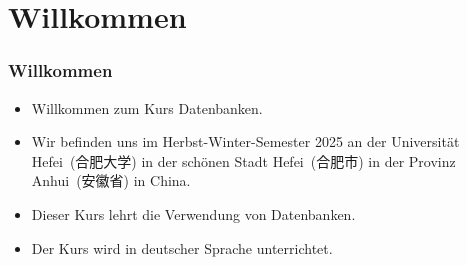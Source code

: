 \documentclass[aspectratio=169,mathserif,notheorems]{beamer}%
\subtitle{1.~Organisation}%
\begin{document}
%
%
\startPresentation%
%
\section{Willkommen}%
%
\begin{frame}[t]%
\frametitle{Willkommen}%
\begin{itemize}%
%
\item Willkommen zum Kurs \alert{Datenbanken}.%
%
\item<2-> Wir befinden uns im Herbst-Winter-Semester 2025 an der Universität Hefei~(合肥大学) in der schönen Stadt Hefei~(合肥市) in der Provinz Anhui~(安徽省) in China.%
%
\item<3-> Dieser Kurs lehrt die Verwendung von Datenbanken.%
%
\item<4-> Der Kurs wird in deutscher Sprache unterrichtet.%
%
\end{itemize}%
\end{frame}%
%
\end{document}
